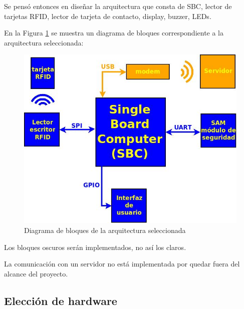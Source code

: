 \documentclass[%
        final,
        notitlepage,
        narroweqnarray,
        inline,
        ]{ieee}
\begin{document}
Se pensó entonces en diseñar la arquitectura que consta de SBC, lector de tarjetas RFID, lector de tarjeta de contacto, display, buzzer, LEDs.

En la Figura \ref{Fig:HW_GRAL} se muestra un diagrama de bloques correspondiente a la arquitectura seleccionada:

\begin{figure}[h]
\centering
  \begin{center}
  \includegraphics[scale=.3]{../docs/Imagenes/diagrama_rf2.jpg} 
  \end{center}
  \caption{Diagrama de bloques de la arquitectura seleccionada}\label{Fig:HW_GRAL} 
\end{figure}


Los bloques oscuros serán implementados, no así los claros.

La comunicación con un servidor no está implementada por quedar fuera del alcance del proyecto.

\subsection{Elección de hardware}
\end{document}
